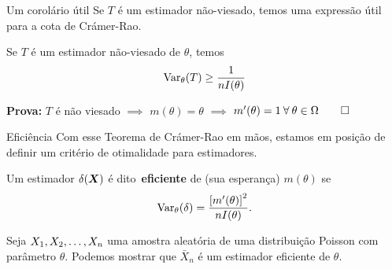 \begin{frame}{Um corolário útil}
Se $T$ é um estimador não-viesado, temos uma expressão útil para a cota de Crámer-Rao.
\begin{obs}
 Se $T$ é um estimador não-viesado de $\theta$, temos
 \begin{equation*}
  \operatorname{Var}_\theta(T) \geq \frac{1}{nI(\theta)}
 \end{equation*}
\end{obs}
\textbf{Prova:} $T$ é não viesado $\implies$ $m(\theta) = \theta$ $\implies$ $m^\prime(\theta) = 1\: \forall\: \theta \in \Omega \qed$
\end{frame}


\begin{frame}{Eficiência}
Com esse Teorema de Crámer-Rao em mãos, estamos em posição de definir um critério de otimalidade para estimadores.
\begin{defn}
 \label{def:efficient_estimator}
 Um estimador $\delta(\boldsymbol{X})$ é dito~\textbf{eficiente} de (sua esperança) $m(\theta)$ se 
 \begin{equation*}
    \operatorname{Var}_\theta(\delta) = \frac{\left[m^\prime(\theta)\right]^2}{nI(\theta)}.
 \end{equation*}
\end{defn}

\begin{exemplo}
 Seja $X_1, X_2, \ldots, X_n$ uma amostra aleatória de uma distribuição Poisson com parâmetro $\theta$.
 Podemos mostrar que $\bar{X}_n$ é um estimador eficiente de $\theta$.
\end{exemplo}
\end{frame}

